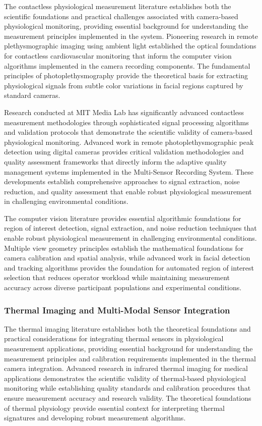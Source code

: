 \documentclass[12pt,a4paper]{article}
\begin{document}
The contactless physiological measurement literature establishes both the scientific foundations and practical
challenges associated with camera-based physiological monitoring, providing essential background for understanding the
measurement principles implemented in the system. Pioneering research in remote plethysmographic imaging using ambient
light established the optical foundations for contactless cardiovascular monitoring that inform the computer vision
algorithms implemented in the camera recording components. The fundamental principles of photoplethysmography provide
the theoretical basis for extracting physiological signals from subtle color variations in facial regions captured by
standard cameras.

Research conducted at MIT Media Lab has significantly advanced contactless measurement methodologies through
sophisticated signal processing algorithms and validation protocols that demonstrate the scientific validity of
camera-based physiological monitoring. Advanced work in remote photoplethysmographic peak detection using digital
cameras provides critical validation methodologies and quality assessment frameworks that directly inform the adaptive
quality management systems implemented in the Multi-Sensor Recording System. These developments establish comprehensive
approaches to signal extraction, noise reduction, and quality assessment that enable robust physiological measurement in
challenging environmental conditions.

The computer vision literature provides essential algorithmic foundations for region of interest detection, signal
extraction, and noise reduction techniques that enable robust physiological measurement in challenging environmental
conditions. Multiple view geometry principles establish the mathematical foundations for camera calibration and spatial
analysis, while advanced work in facial detection and tracking algorithms provides the foundation for automated region
of interest selection that reduces operator workload while maintaining measurement accuracy across diverse participant
populations and experimental conditions.

\subsubsection{Thermal Imaging and Multi-Modal Sensor Integration}

The thermal imaging literature establishes both the theoretical foundations and practical considerations for integrating
thermal sensors in physiological measurement applications, providing essential background for understanding the
measurement principles and calibration requirements implemented in the thermal camera integration. Advanced research in
infrared thermal imaging for medical applications demonstrates the scientific validity of thermal-based physiological
monitoring while establishing quality standards and calibration procedures that ensure measurement accuracy and research
validity. The theoretical foundations of thermal physiology provide essential context for interpreting thermal
signatures and developing robust measurement algorithms.
\end{document}
